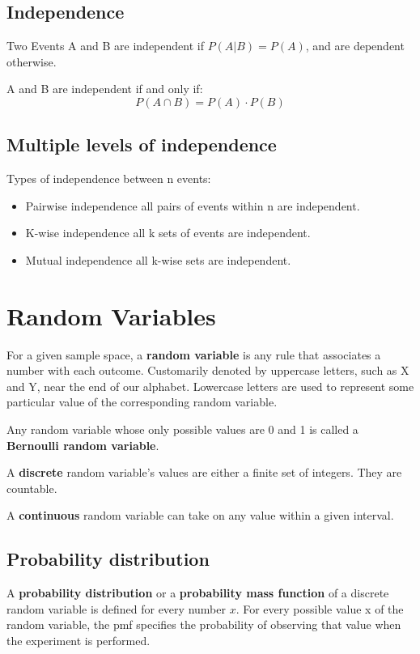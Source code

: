 \documentclass{article}
\begin{document}
{			\subsection*{Independence}
				Two Events A and B are independent if \(P(A|B) = P(A)\), and are dependent otherwise. 

				A and B are independent if and only if:
				\[
					P(A \cap B) = P(A) \cdot P(B)
				\]

			\subsection*{Multiple levels of independence}
				Types of independence between n events:
				\begin{itemize}
					\item Pairwise independence all pairs of events within n are independent.
					\item K-wise independence all k sets of events are independent.
					\item Mutual independence all k-wise sets are independent.
				\end{itemize} 

		\section*{\Large{\textbf{Random Variables}}}
			
			For a given sample space, a \textbf{random variable} is any rule that associates a number with each outcome. Customarily denoted by uppercase letters, such as X and Y, near the end of our alphabet. Lowercase letters are used to represent some particular value of the corresponding random variable. 

			Any random variable whose only possible values are 0 and 1 is called a \textbf{Bernoulli random variable}.

			A \textbf{discrete} random variable's values are either a finite set of integers. They are countable.

			A \textbf{continuous} random variable can take on any value within a given interval. 

			\subsection*{Probability distribution}
				A \textbf{probability distribution} or a \textbf{probability mass function} of a discrete random variable is defined for every number \(x\). For every possible value x of the random variable, the pmf specifies the probability of observing that value when the experiment is performed.

}
\end{document}
